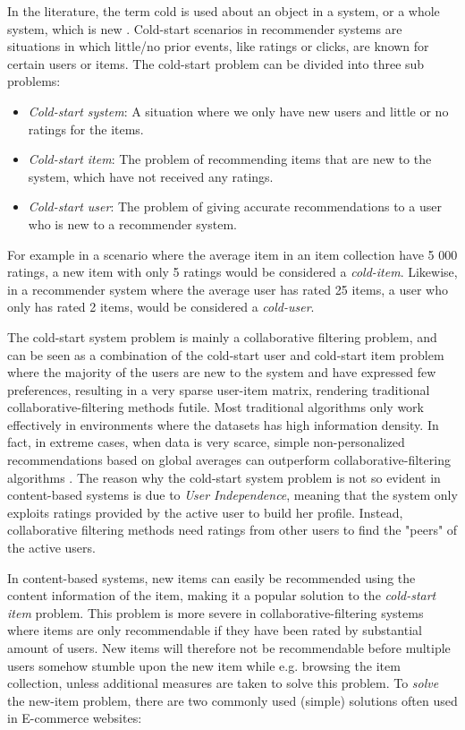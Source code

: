 In the literature, the term cold is used about an object in a system, or a
whole system, which is new \cite{Schein2002, Park2006}. Cold-start scenarios in recommender systems are
situations in which little/no prior events, like ratings or clicks, are known
for certain users or items. The cold-start problem can be divided into three sub problems:

\begin{itemize}
  \item \emph{Cold-start system}: A situation where we only have new users and
  little or no ratings for the items.

  \item \emph{Cold-start item}: The problem of recommending items that are new
  to the system, which have not received any ratings.

  \item \emph{Cold-start user}: The problem of giving accurate recommendations
  to a user who is new to a recommender system.
\end{itemize}

For example in a scenario where the average item in an item collection have 5 000 ratings, a new item with only 5 ratings would be considered a \emph{cold-item}. Likewise, in a recommender system where the average user has rated 25 items, a user who only has rated 2 items, would be considered a \emph{cold-user}.\linebreak[4]

The cold-start system problem is mainly a collaborative filtering problem, and
can be seen as a combination of the cold-start user and cold-start item problem
where the majority of the users are new to the system and have expressed few
preferences, resulting in a very sparse user-item matrix, rendering traditional collaborative-filtering methods futile. Most traditional algorithms only work effectively in environments where the datasets has high information density. In fact, in extreme cases, when data
is very scarce, simple non-personalized recommendations based on global
averages can outperform collaborative-filtering algorithms \cite{Park2006}. The reason why the cold-start system problem is not so evident in content-based systems is due to \emph{User Independence}, meaning that the system only exploits ratings provided by the active user to build her profile. Instead, collaborative filtering methods need ratings from other users to find the "peers" of the active users.

In content-based systems, new items can easily be
recommended using the content information of the item, making it a popular
solution to the \emph{cold-start item} problem. This problem is more
severe in collaborative-filtering systems where items are only recommendable if
they have been rated by substantial amount of users. New items will therefore not be
recommendable before multiple users somehow stumble upon the new item while
e.g. browsing the item collection, unless additional measures are taken to
solve this problem. To \emph{solve} the new-item problem, there are two commonly used (simple) solutions often used in E-commerce websites:

